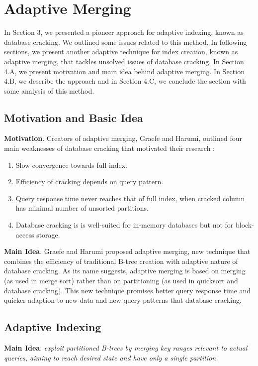 \documentclass[10pt, conference, compsocconf]{IEEEtran}
\begin{document}
\section{Adaptive Merging}
In Section 3, we presented a pioneer approach for adaptive indexing, known as database cracking. We outlined some issues related to this method. In following sections, we present another adaptive technique for index creation, known as adaptive merging, that tackles unsolved issues of database cracking. In Section 4.A, we present motivation and main idea behind adaptive merging. In Section 4.B, we describe the approach and in Section 4.C, we conclude the section with some analysis of this method.

\subsection{Motivation and Basic Idea}
\textbf{Motivation}. Creators of adaptive merging, Graefe and Harumi, outlined four main weaknesses of database cracking that motivated their research \cite{merging}:
\begin{enumerate}
\item{Slow convergence towards full index.}
\item{Efficiency of cracking depends on query pattern.}
\item{Query response time never reaches that of full index, when cracked column has minimal number of unsorted partitions.}
\item{Database cracking is is well-suited for in-memory databases but not for block-access storage.}
\end{enumerate}

\textbf{Main Idea}. Graefe and Harumi proposed adaptive merging, new technique that combines the efficiency of traditional B-tree creation with adaptive nature of database cracking. As its name suggests, adaptive merging is based on merging (as used in merge sort) rather than on partitioning (as used in quicksort and database cracking). This new technique promises better query response time and quicker adaption to new data and new query patterns that database cracking.

\subsection{Adaptive Indexing}
\textbf{Main Idea}: \textit{exploit partitioned B-trees by merging key ranges relevant to actual queries, aiming to reach desired state and have only a single partition.}\\
\end{document}

